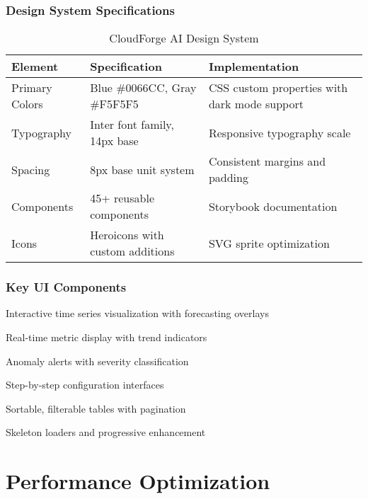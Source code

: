\subsubsection{Design System Specifications}

\begin{table}[H]
\centering
\caption{CloudForge AI Design System}
\begin{tabular}{|p{3cm}|p{4cm}|p{5cm}|}
\hline
\textbf{Element} & \textbf{Specification} & \textbf{Implementation} \\
\hline
Primary Colors & Blue \#0066CC, Gray \#F5F5F5 & CSS custom properties with dark mode support \\
\hline
Typography & Inter font family, 14px base & Responsive typography scale \\
\hline
Spacing & 8px base unit system & Consistent margins and padding \\
\hline
Components & 45+ reusable components & Storybook documentation \\
\hline
Icons & Heroicons with custom additions & SVG sprite optimization \\
\hline
\end{tabular}
\end{table}

\subsubsection{Key UI Components}

\begin{description}[leftmargin=*]
    \item[AIChart] Interactive time series visualization with forecasting overlays
    \item[MetricCard] Real-time metric display with trend indicators
    \item[AlertPanel] Anomaly alerts with severity classification
    \item[ConfigurationWizard] Step-by-step configuration interfaces
    \item[DataTable] Sortable, filterable tables with pagination
    \item[LoadingStates] Skeleton loaders and progressive enhancement
\end{description}

\section{Performance Optimization}

